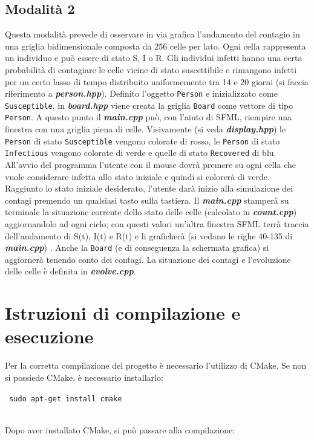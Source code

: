 \documentclass[a4paper,10 pt]{article}
\begin{document}
\subsection{Modalità 2}
Questa modalità prevede di osservare in via grafica l'andamento del contagio in una griglia bidimensionale composta da 256 celle per lato. Ogni cella rappresenta un individuo e può essere di stato S, I o R. Gli individui infetti hanno una certa probabilità di contagiare le celle vicine di stato suscettibile e rimangono infetti per un certo lasso di tempo distribuito uniformemente tra 14 e 20 giorni (si faccia riferimento a \textbf{\textit{person.hpp}}). Definito l'oggetto \verb!Person! e inizializzato come \verb!Susceptible!, in \textbf{\textit{board.hpp}} viene creata la griglia \verb!Board! come vettore di tipo  \verb!Person!. A questo punto il \textbf{\textit{main.cpp}} può, con l'aiuto di SFML, riempire una finestra con una griglia piena di celle. Visivamente (si veda  \textbf{\textit{display.hpp}}) le \verb!Person! di stato \verb!Susceptible! vengono colorate di rosso, le \verb!Person! di stato \verb!Infectious! vengono colorate di verde e quelle di stato \verb!Recovered! di blu.
\ \\
All'avvio del programma l'utente con il mouse dovrà premere su ogni cella che vuole considerare infetta allo stato iniziale e quindi si colorerà di verde. Raggiunto lo stato iniziale desiderato, l'utente darà inizio alla simulazione dei contagi premendo un qualsiasi tasto sulla tastiera. Il \textbf{\textit{main.cpp}} stamperà su terminale la situazione corrente dello stato delle celle (calcolato in \textbf{\textit{count.cpp}}) aggiornandolo ad ogni ciclo; con questi valori un'altra finestra SFML terrà traccia dell'andamento di S(t), I(t) e R(t) e li graficherà (si vedano le righe 40-135 di \textbf{\textit{main.cpp}}) . Anche la \verb!Board! (e di conseguenza la schermata grafica) si aggiornerà tenendo conto dei contagi. La situazione dei contagi e l'evoluzione delle celle è definita in \textbf{\textit{evolve.cpp}}.

\section{Istruzioni di compilazione e esecuzione}

Per la corretta compilazione del progetto è necessario l'utilizzo di CMake. %
Se non si possiede CMake, è necessario installarlo:
\begin {quoting}
 \verb! sudo apt-get install cmake !
\end{quoting}
\ \\
Dopo aver installato CMake, si può passare alla compilazione:
\end{document}
